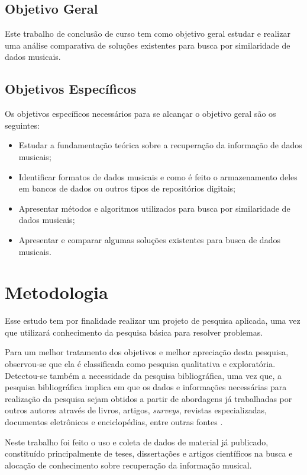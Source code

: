\subsection{Objetivo Geral}
Este trabalho de conclusão de curso tem como objetivo geral estudar e realizar uma análise comparativa de soluções existentes para busca por similaridade de dados musicais.

\subsection{Objetivos Específicos}
Os objetivos específicos necessários para se alcançar o objetivo geral são os seguintes:

 \begin{itemize}
   \item Estudar a fundamentação teórica sobre a recuperação da informação de dados musicais;
   \item Identificar formatos de dados musicais e como é feito o armazenamento deles em bancos de dados ou outros tipos de repositórios digitais;
   \item Apresentar métodos e algoritmos utilizados para busca por similaridade de dados musicais;
   \item Apresentar e comparar algumas soluções existentes para busca de dados musicais.
 \end{itemize}
 
\section{Metodologia}

Esse estudo tem por finalidade realizar um projeto de pesquisa aplicada, uma vez que utilizará conhecimento da pesquisa básica para resolver problemas.

Para um melhor tratamento dos objetivos e melhor apreciação desta pesquisa, observou-se que ela é classificada como pesquisa qualitativa e exploratória. Detectou-se também a necessidade da pesquisa bibliográfica, uma vez que, a pesquisa bibliográfica implica em que os dados e informações necessárias para realização da pesquisa sejam obtidos a partir de abordagens já trabalhadas por outros autores através de livros, artigos, \textit{surveys}, revistas especializadas, documentos eletrônicos e enciclopédias, entre outras fontes \cite{ednalucia2005}.

Neste trabalho foi feito o uso e coleta de dados de material já publicado, constituído principalmente de teses, dissertações e artigos científicos na busca e alocação de conhecimento sobre recuperação da informação musical.


